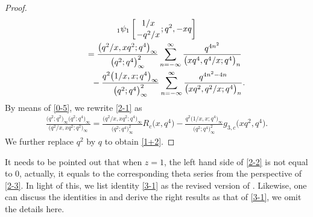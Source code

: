 \documentclass[pdftex]{sigma}
\numberwithin{equation}{section}
\begin{document}
\begin{proof}
\begin{gather}
{_1\psi_1}\left[{1/x \atop -q^2/x};q^2,-xq\right]\nonumber\\
\qquad=\frac{\bigl(q^2/x,xq^2;q^4\bigr)_{\infty}}{\bigl(q^2;q^4\bigr)_{\infty}^2}
\sum_{n=-\infty}^{\infty}\frac{q^{4n^2}}{\bigl(xq^4,q^4/x;q^4\bigr)_n}\nonumber\\
\phantom{\qquad=}{}-\frac{q^2\bigl(1/x,x;q^4\bigr)_{\infty}}{\bigl(q^2;q^4\bigr)_{\infty}^2}
\sum_{n=-\infty}^{\infty}\frac{q^{4n^2-4n}}{\bigl(xq^2,q^2/x;q^4\bigr)_n}.\label{2-1}
\end{gather}
By means of \eqref{0-5}, we rewrite \eqref{2-1} as
\begin{align*}
\frac{\bigl(q^2;q^2\bigr)_{\infty}\bigl(q^2;q^4\bigr)_{\infty}}{\bigl(q^2/x,xq^2;q^2\bigr)_{\infty}}
=\frac{\bigl(q^2/x,xq^2;q^4\bigr)_{\infty}}{\bigl(q^2;q^4\bigr)_{\infty}^2}R_c\bigl(x,q^4\bigr)
-\frac{q^2\bigl(1/x,x;q^4\bigr)_{\infty}}{\bigl(q^2;q^4\bigr)_{\infty}^2}g_{3,c}\bigl(xq^2,q^4\bigr).
\end{align*}
We further replace $q^2$ by $q$ to obtain \eqref{1+2}.
\end{proof}



\begin{Remark}
It needs to be pointed out that when $z=1$, the left hand side of \eqref{2-2} is not equal to $0$, actually, it equals to the corresponding theta series from the perspective of \eqref{2-3}. In light of this, we list identity \eqref{3-1} as the revised version of \cite[Corollary 2.4]{HZ}. Likewise, one can discuss the identities in \cite[Corollaries 2.6--2.9]{HZ} and derive the right results as that of \eqref{3-1}, we omit the details here.
\end{Remark}
\end{document}
